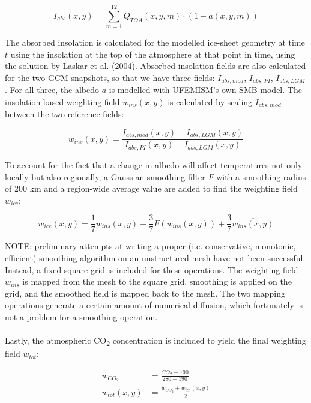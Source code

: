 \documentclass{article}
\begin{document}
\begin{equation} \label{eq:matrix_Iabs}
I_{abs}(x,y) = \sum_{m=1}^{12} Q_{TOA} (x,y,m) \cdot (1 - a( x,y,m))
\end{equation}

The absorbed insolation is calculated for the modelled ice-sheet geometry at time $t$ using the insolation at the top of the atmosphere at that point in time, using the solution by Laskar et al. (2004). Absorbed insolation fields are also calculated for the two GCM snapshots, so that we have three fields: $I_{abs,mod}$, $I_{abs,PI}$, $I_{abs,LGM}$. For all three, the albedo $a$ is modelled with UFEMISM's own SMB model. The insolation-based weighting field $w_{ins}(x,y)$ is calculated by scaling $I_{abs,mod}$ between the two reference fields:

\begin{equation} \label{eq:matrix_wins_T2m}
w_{ins}(x,y) = \frac{I_{abs,mod}(x,y) - I_{abs,LGM}(x,y)}{I_{abs,PI}(x,y) - I_{abs,LGM}(x,y)}
\end{equation}

To account for the fact that a change in albedo will affect temperatures not only locally but also regionally, a Gaussian smoothing filter $F$ with a smoothing radius of 200 km and a region-wide average value are added to find the weighting field $w_{ice}$:

\begin{equation} \label{eq:matrix_wice_T2m}
w_{ice}(x,y) = \frac{1}{7} w_{ins}(x,y) + \frac{3}{7} F \left( w_{ins}(x,y) \right) + \frac{3}{7} \overline{w_{ins}(x,y)}
\end{equation}

NOTE: preliminary attempts at writing a proper (i.e. conservative, monotonic, efficient) smoothing algorithm on an unstructured mesh have not been successful. Instead, a fixed square grid is included for these operations. The weighting field $w_{ins}$ is mapped from the mesh to the square grid, smoothing is applied on the grid, and the smoothed field is mapped back to the mesh. The two mapping operations generate a certain amount of numerical diffusion, which fortunately is not a problem for a smoothing operation.\\
\\
Lastly, the atmospheric CO\textsubscript{2} concentration is included to yield the final weighting field $w_{tot}$:

\begin{align}
w_{CO_2} &= \frac{CO_2 - 190}{280 - 190}\\
w_{tot}(x,y) &= \frac{w_{CO_2} + w_{ice}(x,y)}{2}
\end{align}
\end{document}
